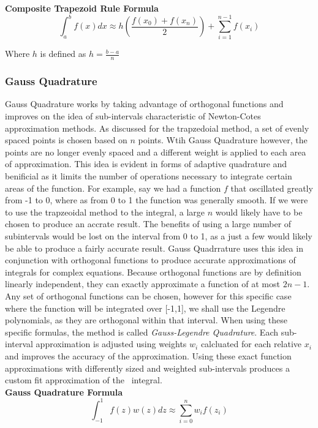 \documentclass[12pt]{article}
\begin{document}
\textbf{Composite Trapezoid Rule Formula}
\[\int_a^b f(x)dx\approx h\left(\frac{f(x_0) + f(x_n)}{2}\right) + \sum_{i = 1}^{n-1} f(x_i)\]

Where \(h\) is defined as \(h = \frac{b-a}{n}\)

\subsubsection{Gauss Quadrature}
Gauss Quadrature works by taking advantage of orthogonal functions and improves on the idea of sub-intervals
characteristic of Newton-Cotes approximation methods. As discussed for the trapzedoial method, a set of 
evenly spaced points is chosen based on \(n\) points. Wtih Gauss Quadrature however, the points are no longer
evenly spaced and a different weight is applied to each area of approximation. This idea is evident in forms
of adaptive quadrature and benificial as it limits the number of operations necessary to integrate certain areas
of the function. For example, say we had a function \(f\) that oscillated greatly from 
-1 to 0, where as from 0 to 1 the function was generally smooth. If we were to use the trapzeoidal method to 
the integral, a large \(n\) would likely have to be chosen to produce an accrate result. The benefits of using
a large number of subintervals would be lost on the interval from 0 to 1, as a just a few would likely be able to
produce a fairly accurate result. Gauss Quadrrature uses this idea in conjunction with orthogonal functions to produce
accurate approximations of integrals for complex equations. Because orthogonal functions are by definition linearly
independent, they can exactly approximate a function of at most \(2n-1\). Any set of orthogonal functions can be chosen,
however for this specific case where the function will be integrated over [-1,1], we shall use the Legendre polynomials,
as they are orthogonal within that interval. When using these specific formulas, the method is called \emph{Gauss-Legendre 
Quadrature}. Each sub-interval approximation is adjusted using
weights \(w_i\) calcluated for each relative \(x_i\) and improves the accuracy of the approximation. Using these exact
function approximations with differently sized and weighted sub-intervals produces a custom fit approximation of the \
integral.\\

\textbf{Gauss Quadrature Formula}
\[\int_{-1}^1 f(z) w(z) dz\approx \sum_{i = 0}^{n} w_i f(z_i)\]
\end{document}
